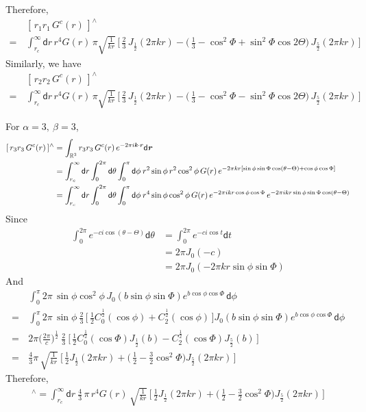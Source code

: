 \documentclass[aps,pre,preprint]{revtex4}
\renewcommand{\v}[1]{\textbf{\textit{#1}}}
\renewcommand{\d}[1]{\textsf{#1}}
\begin{document}
Therefore,
\begin{align}\nonumber
  &[\,r_1r_1\,G^c(r)\,]^{\wedge} \\
  =\,&
  \int_{r_c}^\infty \d dr\, r^4 G(r)\,
  \pi \sqrt{ \frac1{kr} }\,
  \Big[\,
  \frac23\,J_{\frac12}(2\pi kr) -
  \big(\,
  \frac13 -
  \cos^2\Phi +
  \sin^2\Phi\cos2\Theta
  \big)\, J_{\frac52}(2\pi kr)
  \,\Big] 
\end{align}
Similarly, we have
\begin{align}\nonumber
  &[\,r_2 r_2\,G^c(r)\,]^{\wedge} \\
  =\,&
  \int_{r_c}^\infty \d dr\, r^4 G(r)\,
  \pi \sqrt{ \frac1{kr} }\,
  \Big[\,
  \frac23\,J_{\frac12}(2\pi kr) -
  \big(\,
  \frac13 -
  \cos^2\Phi -
  \sin^2\Phi\cos2\Theta
  \big)\, J_{\frac52}(2\pi kr)
  \,\Big] 
\end{align}

For $\alpha = 3,\ \beta = 3$,
\begin{align}\nonumber
  [\,r_3 r_3\,G^c(r)\,]^{\wedge} 
  &= \int_{\mathbb R^3} r_3 r_3\,G^c(r)\, e^{-2\pi i\v k\cdot\v r}\d d\v r \\\nonumber
  &= \int_{r_c}^\infty \d dr \int_{0}^{2\pi} \d d\theta \int_0^\pi\d d\phi\:
  r^2\sin\phi \,r^2 \cos^2\phi\,G(r)\,
  e^{-2\pi k r[\sin\phi\sin\Phi\cos(\theta - \Theta) + \cos\phi\cos\Phi]} \\
  &= \int_{r_c}^\infty \d dr \int_{0}^{2\pi} \d d\theta \int_0^\pi\d d\phi\:
  r^4\sin\phi\cos^2\phi\,G(r)\,e^{-2\pi i kr\cos\phi\cos\Phi}
  \,e^{-2\pi i kr\sin\phi\sin\Phi\cos(\theta- \Theta)}
\end{align}
Since
\begin{align}\nonumber
  \int_0^{2\pi} e^{-c i\cos(\theta - \Theta)} \d d\theta
  &=
  \int_0^{2\pi} e^{-c i\cos t} \d dt \\\nonumber
  &=
  2\pi J_0(-c)\\
  & =
  2\pi J_0(-2\pi kr\sin\phi\sin\Phi)
\end{align}
And
\begin{align}\nonumber
  &
  \int_0^\pi 2\pi \,\sin\phi\cos^2\phi\,
  J_0(b\sin\phi\sin\Phi) e^{b\cos\phi\cos\Phi} \,\d d\phi \\\nonumber
  = \,&
  \int_0^\pi 2\pi \,\sin\phi \:\frac23\,
  \Big[\,
  \frac12 C_0^{\frac12} (\cos\phi) + C_2^{\frac12}(\cos\phi)
  \,\Big]
  J_0(b\sin\phi\sin\Phi) e^{b\cos\phi\cos\Phi} \,\d d\phi \\ \nonumber
  = \,&
  2\pi \Big(\frac{2\pi}c \Big)^{\frac12} \:\frac23\:
  \Big[\,
  \frac12 C_0^{\frac12}(\cos\Phi) J_{\frac12}(b) -
  C_2^{\frac12} (\cos\Phi) J_{\frac52}(b)
  \,\Big] \\
  = \,&
  \frac43 \pi \,\sqrt{\frac1{kr}}\:
  \Big[\,
  \frac12 J_{\frac12}(2\pi kr) +
  \big(\,
  \frac12 - \frac32 \cos^2\Phi
  \big)
  J_{\frac52}(2\pi kr)
  \,\Big]
\end{align}
Therefore,
\begin{align}
  [\,r_3 r_3\,G^c(r)\,]^{\wedge} 
  =
  \int_{r_c}^\infty \d dr\: \frac43\,\pi\,r^4 G(r)\,
  \sqrt{ \frac1{kr} }\,
  \Big[\,
  \frac12 J_{\frac12}(2\pi kr) +
  \big(\,
  \frac12 - \frac32 \cos^2\Phi
  \big)
  J_{\frac52}(2\pi kr)
  \,\Big]
\end{align}
\end{document}
